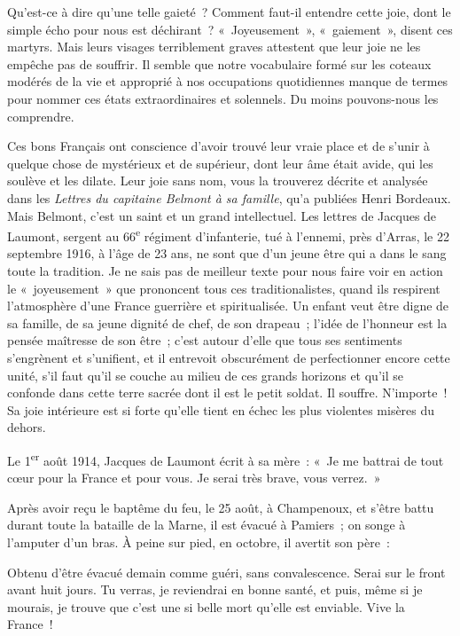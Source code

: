 \documentclass[french,twoside]{book} %
\newenvironment{quoteblock}%
  {\begin{quoting}}
  {\end{quoting}}
\newenvironment{quotebar}{%
    \def\FrameCommand{{\color{rubric!10!}\vrule width 0.5em} \hspace{0.9em}}%
    \def\OuterFrameSep{\itemsep} %
    \MakeFramed {\advance\hsize-\width \FrameRestore}
  }%
  {%
    \endMakeFramed
  }
\renewenvironment{quoteblock}%
  {%
    \savenotes
    \setstretch{0.9}
    \normalfont
    \begin{quotebar}
  }
  {%
    \end{quotebar}
    \spewnotes
  }
\begin{document}
\noindent Qu’est-ce à dire qu’une telle gaieté ? Comment faut-il entendre cette joie, dont le simple écho pour nous est déchirant ? « Joyeusement », « gaiement », disent ces martyrs. Mais leurs visages terriblement graves attestent que leur joie ne les empêche pas de souffrir. Il semble que notre vocabulaire formé sur les coteaux modérés de la vie et approprié à nos occupations quotidiennes manque de termes pour nommer ces états extraordinaires et solennels. Du moins pouvons-nous les comprendre.‌\par
Ces bons Français ont conscience d’avoir trouvé leur vraie place et de s’unir à quelque chose de mystérieux et de supérieur, dont leur âme était avide, qui les soulève et les dilate. Leur joie sans nom, vous la trouverez décrite et analysée dans les {\itshape Lettres du capitaine Belmont à sa famille}, qu’a publiées Henri Bordeaux. Mais Belmont, c’est un saint et un grand intellectuel. Les lettres de Jacques de Laumont, sergent au 66\textsuperscript{e} régiment d’infanterie, tué à l’ennemi, près d’Arras, le 22 septembre 1916, à l’âge de 23 ans, ne sont que d’un jeune être qui a dans le sang toute la tradition. Je ne sais pas de meilleur texte pour nous faire voir en action le « joyeusement » que prononcent tous ces traditionalistes, quand ils respirent l’atmosphère d’une France guerrière et spiritualisée. Un enfant veut être digne de sa famille, de sa jeune dignité de chef, de son drapeau ; l’idée de l’honneur est la pensée maîtresse de son être ; c’est autour d’elle que tous ses sentiments s’engrènent et s’unifient, et il entrevoit obscurément de perfectionner encore cette unité, s’il faut qu’il se couche au milieu de ces grands horizons et qu’il se confonde dans cette terre sacrée dont il est le petit soldat. Il souffre. N’importe ! Sa joie intérieure est si forte qu’elle tient en échec les plus violentes misères du dehors.‌\par
Le 1\textsuperscript{er} août 1914, Jacques de Laumont écrit à sa mère : « Je me battrai de tout cœur pour la France et pour vous. Je serai très brave, vous verrez. »‌\par
Après avoir reçu le baptême du feu, le 25 août, à Champenoux, et s’être battu durant toute la bataille de la Marne, il est évacué à Pamiers ; on songe à l’amputer d’un bras. À peine sur pied, en octobre, il avertit son père :‌\par

\begin{quoteblock}
 \noindent Obtenu d’être évacué demain comme guéri, sans convalescence. Serai sur le front avant huit jours. Tu verras, je reviendrai en bonne santé, et puis, même si je mourais, je trouve que c’est une si belle mort qu’elle est enviable. Vive la France !‌
 \end{quoteblock}
\end{document}
